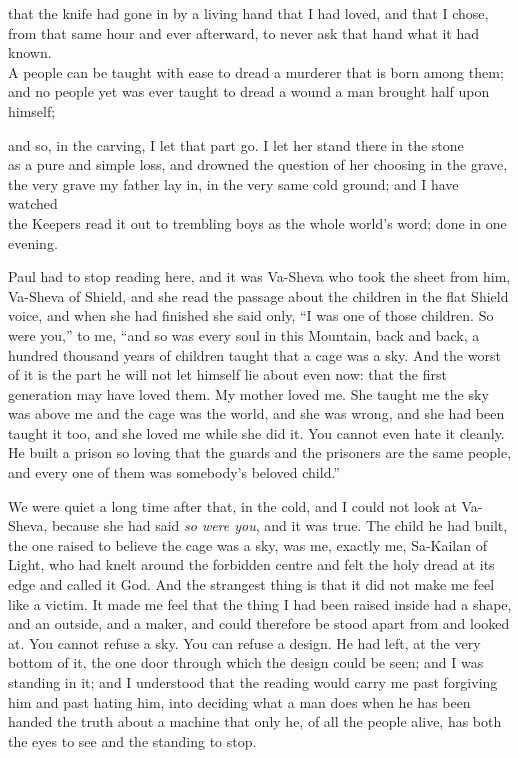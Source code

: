 \begin{scripture}
that the knife had gone in by a living hand that I had loved, and that I chose, \\
from that same hour and ever afterward, to never ask that hand what it had known. \\
A people can be taught with ease to dread a murderer that is born among them; \\
and no people yet was ever taught to dread a wound a man brought half upon himself; \\
\medskip

and so, in the carving, I let that part go. I let her stand there in the stone \\
as a pure and simple loss, and drowned the question of her choosing in the grave, \\
the very grave my father lay in, in the very same cold ground; and I have watched \\
the Keepers read it out to trembling boys as the whole world's word; done in one evening. \\
\end{scripture}

\ornament

Paul had to stop reading here, and it was Va-Sheva who took the sheet from him, Va-Sheva of Shield, and she read the passage about the children in the flat Shield voice, and when she had finished she said only, ``I was one of those children. So were you,'' to me, ``and so was every soul in this Mountain, back and back, a hundred thousand years of children taught that a cage was a sky. And the worst of it is the part he will not let himself lie about even now: that the first generation may have loved them. My mother loved me. She taught me the sky was above me and the cage was the world, and she was wrong, and she had been taught it too, and she loved me while she did it. You cannot even hate it cleanly. He built a prison so loving that the guards and the prisoners are the same people, and every one of them was somebody's beloved child.''\par

\ornament

We were quiet a long time after that, in the cold, and I could not look at Va-Sheva, because she had said \emph{so were you}, and it was true. The child he had built, the one raised to believe the cage was a sky, was me, exactly me, Sa-Kailan of Light, who had knelt around the forbidden centre and felt the holy dread at its edge and called it God. And the strangest thing is that it did not make me feel like a victim. It made me feel that the thing I had been raised inside had a shape, and an outside, and a maker, and could therefore be stood apart from and looked at. You cannot refuse a sky. You can refuse a design. He had left, at the very bottom of it, the one door through which the design could be seen; and I was standing in it; and I understood that the reading would carry me past forgiving him and past hating him, into deciding what a man does when he has been handed the truth about a machine that only he, of all the people alive, has both the eyes to see and the standing to stop.\par

